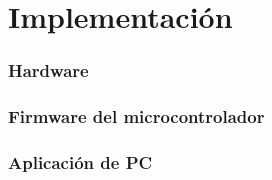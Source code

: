 \part{Implementación}\label{part:implementacion}

\section{Hardware}

\section{Firmware del microcontrolador}

\section{Aplicación de PC}
